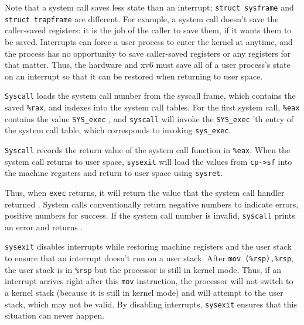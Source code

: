 {Note that a system call saves less state than an interrupt;
\lstinline{struct sysframe}
and
\lstinline{struct trapframe}
are different.  For example, a system call doesn't save the caller-saved
registers: it is the job of the caller to save them, if it wants them to be
saved.  Interrupts can force a user process to enter the kernel at anytime, and
the process has no opportunity to save caller-saved registers or any registers
for that matter.  Thus, the hardware and xv6 must save all of a user process's
state on an interrupt so that it can be restored when returning to user space.

\lstinline{Syscall}
loads the system call number from the syscall frame, which
contains the saved
\texttt{\%rax},
and indexes into the system call tables.
For the first system call, 
\texttt{\%eax}
contains the value 
\lstinline{SYS_exec}
,
and
\lstinline{syscall}
will invoke the 
\lstinline{SYS_exec} 'th 
entry of the system call table, which corresponds to invoking
\lstinline{sys_exec}.

\lstinline{Syscall}
records the return value of the system call function in
\texttt{\%eax}.
When the system call returns to user space,
\lstinline{sysexit}
will load the values
from
\lstinline{cp->sf}
into the machine registers
and return to user space
using
\lstinline{sysret}.

Thus, when 
\lstinline{exec}
returns, it will return the value
that the system call handler returned
.
System calls conventionally return negative numbers to indicate
errors, positive numbers for success.
If the system call number is invalid,
\lstinline{syscall}
prints an error and returns .

\lstinline{sysexit}
disables interrupts
while restoring machine registers and the user stack to
ensure that an interrupt doesn't run on a user stack.  After
\lstinline{mov (%rsp),%rsp},
the user stack is in
\texttt{\%rsp}
but the processor is still in kernel mode.
Thus, if an interrupt arrives right after this
\lstinline{mov}
instruction,
the processor will not switch to a kernel stack (because it is still in kernel
mode) and will attempt to the user stack, which may not be valid.
By disabling interrupts,
\lstinline{sysexit}
ensures that this situation can never happen.
}
